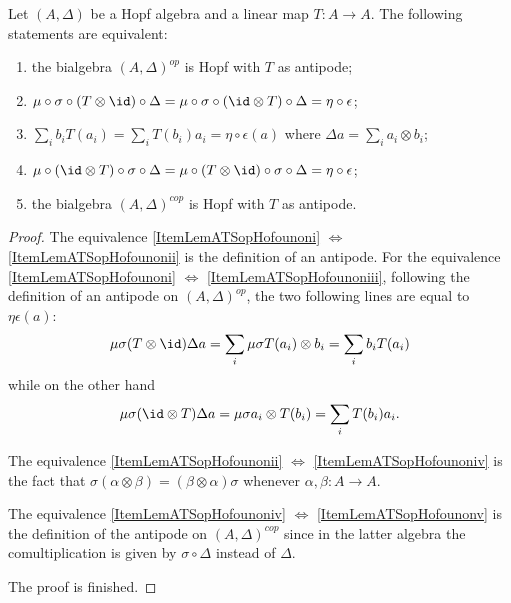 \begin{lemma}       \label{LemATSopHofounon}
    Let \( (A,\Delta)\) be a Hopf algebra and a linear map \( T\colon A\to A\). The following statements are equivalent:
    \begin{enumerate}
        \item\label{ItemLemATSopHofounoni}
            the bialgebra \( (A,\Delta)^{op}\) is Hopf with \( T\) as antipode;
        \item\label{ItemLemATSopHofounonii}
            \( \mu\circ\sigma\circ(T\otimes\id)\circ\Delta=\mu\circ\sigma\circ(\id\otimes T)\circ\Delta=\eta\circ\epsilon\);
        \item\label{ItemLemATSopHofounoniii}
            \( \sum_i b_iT(a_i)=\sum_i T(b_i)a_i=\eta\circ\epsilon(a)\) where \( \Delta a=\sum_i a_i\otimes b_i\);
        \item\label{ItemLemATSopHofounoniv}
            \( \mu\circ(\id\otimes T)\circ\sigma\circ\Delta=\mu\circ(T\otimes\id)\circ\sigma\circ\Delta=\eta\circ\epsilon\);
        \item\label{ItemLemATSopHofounonv}
            the bialgebra \( (A,\Delta)^{cop}\) is Hopf with \( T\) as antipode.
    \end{enumerate}
\end{lemma}

\begin{proof}
    The equivalence \ref{ItemLemATSopHofounoni} \( \Leftrightarrow\) \ref{ItemLemATSopHofounonii} is the definition of an antipode. For the equivalence \ref{ItemLemATSopHofounoni} \( \Leftrightarrow\) \ref{ItemLemATSopHofounoniii}, following the definition of an antipode on \( (A,\Delta)^{op}\), the two following lines are equal to \( \eta\epsilon(a)\):
    \begin{equation}
        \mu\sigma(T\otimes \id)\Delta a=\sum_i\mu\sigma T(a_i)\otimes b_i=\sum_i b_i T(a_i)
    \end{equation}
    while on the other hand
    \begin{equation}
        \mu\sigma(\id\otimes T)\Delta a=\mu\sigma a_i\otimes T(b_i)=\sum_i T(b_i)a_i.
    \end{equation}
    
    The equivalence \ref{ItemLemATSopHofounonii} \( \Leftrightarrow\) \ref{ItemLemATSopHofounoniv} is the fact that \( \sigma(\alpha\otimes\beta)=(\beta\otimes \alpha)\sigma\) whenever \( \alpha,\beta\colon A\to A\).

    The equivalence \ref{ItemLemATSopHofounoniv} \( \Leftrightarrow\) \ref{ItemLemATSopHofounonv} is the definition of the antipode on \( (A,\Delta)^{cop}\) since in the latter algebra the comultiplication is given by \( \sigma\circ\Delta\) instead of \( \Delta\).

    The proof is finished.
\end{proof}

